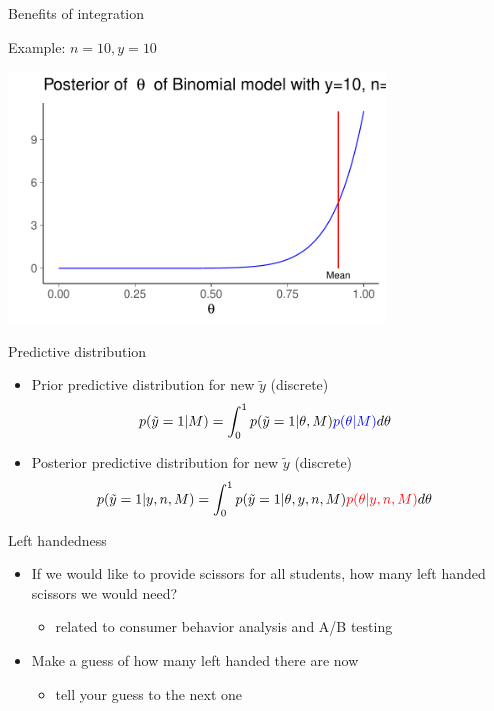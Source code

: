 \documentclass[english,t]{beamer}
\begin{document}
\begin{frame}{Benefits of integration}

  Example: $n=10, y=10$
  \begin{center}
    \includegraphics[width=10cm]{dbbeta10.pdf}
  \end{center}

\end{frame}

\begin{frame}{Predictive distribution}

  \begin{itemize}
  \item {\color{blue} Prior predictive} distribution for new $\tilde{y}$ (discrete)
    \begin{align*}
      p(\tilde{y}=1|M) &= \int_0^1 p(\tilde{y}=1|\theta,M){\color{blue}p(\theta|M)}d\theta
    \end{align*}
  \item {\color{red} Posterior predictive} distribution for new $\tilde{y}$ (discrete)
    \begin{align*}
      p(\tilde{y}=1|y,n,M) &= \int_0^1 p(\tilde{y}=1|\theta,y,n,M){\color{red}p(\theta|y,n,M)}d\theta
    \end{align*}
  \end{itemize}
\end{frame}

\begin{frame}{Left handedness}

  \begin{itemize}
  \item<+-> If we would like to provide scissors for all students, how
    many left handed scissors we would need?
    \begin{itemize}
    \item related to consumer behavior analysis and A/B testing
  \end{itemize}
\item<+-> Make a guess of how many left handed there are now
  \begin{itemize}
  \item<+-> tell your guess to the next one
  \end{itemize}
\end{itemize}  

\end{frame}
\end{document}
